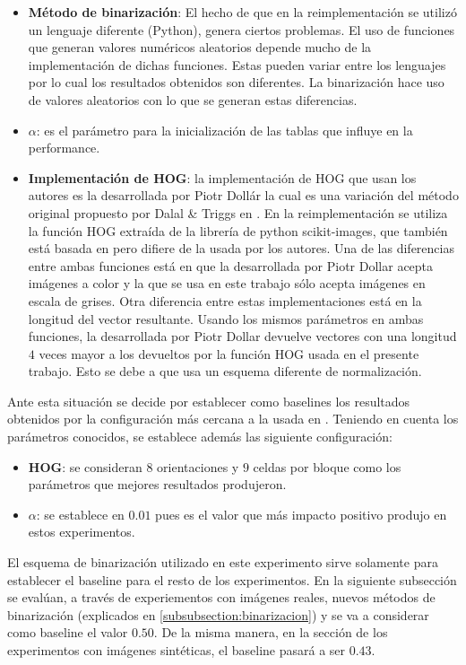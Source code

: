 	\begin{itemize}
		\item \textbf{Método de binarización}: El hecho de que en la reimplementación se utilizó un lenguaje diferente (Python), genera ciertos problemas. El uso de funciones que generan valores numéricos aleatorios depende mucho de la implementación de dichas funciones. Estas pueden variar entre los lenguajes por lo cual los resultados obtenidos son diferentes. La binarización hace uso de valores aleatorios con lo que se generan estas diferencias.
		\item \textbf{$\alpha$}: es el parámetro para la inicialización de las tablas que influye en la performance.
		\item \textbf{Implementación de HOG}: la implementación de HOG que usan los autores es la desarrollada por Piotr Dollár \cite{PiotrD} la cual es una variación del método original propuesto por Dalal \& Triggs en \cite{DT05}. En la reimplementación se utiliza la función HOG extraída de la librería de python scikit-images, que también está basada en \cite{DT05} pero difiere de la usada por los autores. Una de las diferencias entre ambas funciones está en que la desarrollada por Piotr Dollar acepta imágenes a color y la que se usa en este trabajo sólo acepta imágenes en escala de grises. Otra diferencia entre estas implementaciones está en la longitud del vector resultante. Usando los mismos parámetros en ambas funciones, la desarrollada por Piotr Dollar devuelve vectores con una longitud $4$ veces mayor a los devueltos por la función HOG usada en el presente trabajo. Esto se debe a que usa un esquema diferente de normalización.
	\end{itemize}
	
	Ante esta situación se decide por establecer como baselines los resultados obtenidos por la configuración más cercana a la usada en \cite{wang}. Teniendo en cuenta los parámetros conocidos, se establece además las siguiente configuración:
	
	\begin{itemize}
		\item \textbf{HOG}: se consideran $8$ orientaciones y $9$ celdas por bloque como los parámetros que mejores resultados produjeron.
		\item \textbf{$\alpha$}: se establece en $0.01$ pues es el valor que más impacto positivo produjo en estos experimentos.
	\end{itemize}		
	
	El esquema de binarización utilizado en este experimento sirve solamente para establecer el baseline para el resto de los experimentos. En la siguiente subsección se evalúan, a través de experiementos con imágenes reales, nuevos métodos de binarización (explicados en \ref{subsubsection:binarizacion}) y se va a considerar como baseline el valor $0.50$. De la misma manera, en la sección de los experimentos con imágenes sintéticas, el baseline pasará a ser $0.43$.
	
